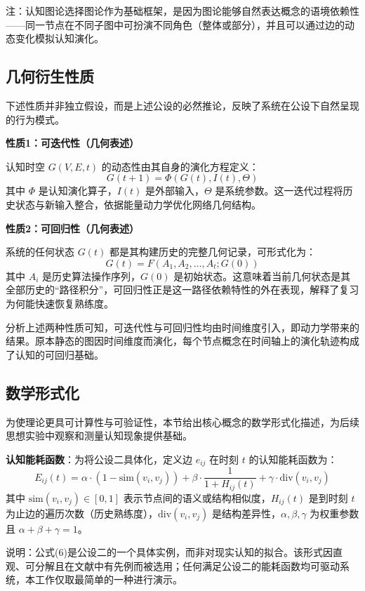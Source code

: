 \documentclass[12pt,a4paper]{article}
\begin{document}
注：认知图论选择图论作为基础框架，是因为图论能够自然表达概念的语境依赖性——同一节点在不同子图中可扮演不同角色（整体或部分），并且可以通过边的动态变化模拟认知演化。

\subsection{几何衍生性质}

下述性质并非独立假设，而是上述公设的必然推论，反映了系统在公设下自然呈现的行为模式。

\textbf{性质1：可迭代性（几何表述）}

认知时空 $G(V,E,t)$ 的动态性由其自身的演化方程定义：
\begin{equation}
G(t+1) = \Phi(G(t), I(t), \Theta)
\end{equation}
其中 $\Phi$ 是认知演化算子，$I(t)$ 是外部输入，$\Theta$ 是系统参数。这一迭代过程将历史状态与新输入整合，依据能量动力学优化网络几何结构。

\textbf{性质2：可回归性（几何表述）}

系统的任何状态 $G(t)$ 都是其构建历史的完整几何记录，可形式化为：
\begin{equation}
G(t) = F(A_1, A_2, \ldots, A_t; G(0))
\end{equation}
其中 $A_i$ 是历史算法操作序列，$G(0)$ 是初始状态。这意味着当前几何状态是其全部历史的“路径积分”，可回归性正是这一路径依赖特性的外在表现，解释了复习为何能快速恢复熟练度。

分析上述两种性质可知，可迭代性与可回归性均由时间维度引入，即动力学带来的结果。原本静态的图因时间维度而演化，每个节点概念在时间轴上的演化轨迹构成了认知的可回归基础。

\subsection{数学形式化}
为使理论更具可计算性与可验证性，本节给出核心概念的数学形式化描述，为后续思想实验中观察和测量认知现象提供基础。

\textbf{认知能耗函数}：为将公设二具体化，定义边 $e_{ij}$ 在时刻 $t$ 的认知能耗函数为：
\begin{equation}
E_{ij}(t) = \alpha \cdot (1 - \text{sim}(v_i, v_j)) + \beta \cdot \frac{1}{1 + H_{ij}(t)} + \gamma \cdot \text{div}(v_i, v_j)
\label{eq:energy_function}
\end{equation}
其中 $\text{sim}(v_i, v_j) \in [0,1]$ 表示节点间的语义或结构相似度，$H_{ij}(t)$ 是到时刻 $t$ 为止边的遍历次数（历史熟练度），$\text{div}(v_i, v_j)$ 是结构差异性，$\alpha, \beta, \gamma$ 为权重参数且 $\alpha + \beta + \gamma = 1$。
\begin{small}
    说明：公式(6)是公设二的一个具体实例，而非对现实认知的拟合。该形式因直观、可分解且在文献中有先例而被选用；任何满足公设二的能耗函数均可驱动系统，本工作仅取最简单的一种进行演示。
\end{small}
\end{document}
